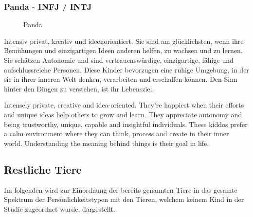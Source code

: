 \subsubsection{Panda - INFJ / INTJ}
\begin{figure}[htbp!]
	\centering
	\caption[Panda]{Panda \cite{knowAndLove}}
	\label{img:Panda}
\end{figure}
Intensiv privat, kreativ und ideenorientiert. Sie sind am glücklichsten, wenn ihre Bemühungen und einzigartigen Ideen anderen helfen, zu wachsen und zu lernen. Sie schätzen Autonomie und sind vertrauenswürdige, einzigartige, fähige und aufschlussreiche Personen. Diese Kinder bevorzugen eine ruhige Umgebung, in der sie in ihrer inneren Welt denken, verarbeiten und erschaffen können. Den Sinn hinter den Dingen zu verstehen, ist ihr Lebensziel. 

	Intensely private, creative and idea-oriented. They're happiest when their efforts and unique ideas help others to grow and learn. They appreciate autonomy and being trustworthy, unique, capable and insightful individuals. These kiddos prefer a calm environment where they can think, process and create in their inner world. Understanding the meaning behind things is their goal in life. \\
\subsection{Restliche Tiere}
Im folgenden wird zur Einordnung der bereits genannten Tiere in das gesamte Spektrum der Persönlichkeitstypen mit den Tieren, welchem keinem Kind in der Studie zugeordnet wurde, dargestellt.



